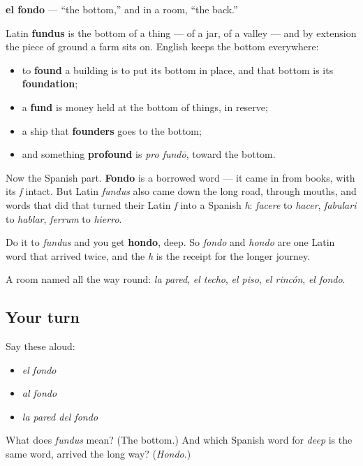 \begin{cousinweb}
\textbf{el fondo} — \textquotedblleft{}the bottom,\textquotedblright{} and in a room, \textquotedblleft{}the back.\textquotedblright{}

Latin \textbf{fundus} is the bottom of a thing — of a jar, of a valley — and by extension the piece of ground a farm sits on. English keeps the bottom everywhere:

\begin{itemize}
\raggedright
  \item to \textbf{found} a building is to put its bottom in place, and that bottom is its \textbf{foundation};
  \item a \textbf{fund} is money held at the bottom of things, in reserve;
  \item a ship that \textbf{founders} goes to the bottom;
  \item and something \textbf{profound} is \emph{pro fundō}, toward the bottom.
\end{itemize}

Now the Spanish part. \textbf{Fondo} is a borrowed word — it came in from books, with its \emph{f} intact. But Latin \emph{fundus} also came down the long road, through mouths, and words that did that turned their Latin \emph{f} into a Spanish \emph{h}: \emph{facere} to \emph{hacer}, \emph{fabulari} to \emph{hablar}, \emph{ferrum} to \emph{hierro}.

Do it to \emph{fundus} and you get \textbf{hondo}, deep. So \emph{fondo} and \emph{hondo} are one Latin word that arrived twice, and the \emph{h} is the receipt for the longer journey.
\end{cousinweb}

\begin{grammarlens}[title={What you've built}]
A room named all the way round: \emph{la pared}, \emph{el techo}, \emph{el piso}, \emph{el rincón}, \emph{el fondo}.
\end{grammarlens}

\subsection*{Your turn}
Say these aloud:

\begin{itemize}
\raggedright
  \item \emph{el fondo}
  \item \emph{al fondo}
  \item \emph{la pared del fondo}
\end{itemize}

\begin{tcolorbox}[breakable,colback=teal!4,colframe=teal!35!black,title={Before you move on}]
What does \emph{fundus} mean? (The bottom.) And which Spanish word for \emph{deep} is the same word, arrived the long way? (\emph{Hondo}.)
\end{tcolorbox}
